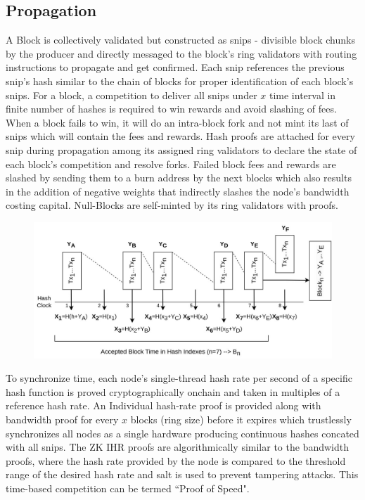 \documentclass[a4paper,	10pt]{extarticle}
\begin{document}
\subsection{Propagation}
A Block is collectively validated but constructed as snips - divisible block chunks by the producer and directly messaged to the block's ring validators with routing instructions to propagate and get confirmed. Each snip references the previous snip's hash similar to the chain of blocks for proper identification of each block's snips. For a block, a competition to deliver all snips under $x$ time interval in finite number of hashes is required to win rewards and avoid slashing of fees. When a block fails to win, it will do an intra-block fork and not mint its last of snips which will contain the fees and rewards. Hash proofs are attached for every snip during propagation among its assigned ring validators to declare the state of each block's competition and resolve forks. Failed block fees and rewards are slashed by sending them to a burn address by the next blocks which also results in the addition of negative weights that indirectly slashes the node's bandwidth costing capital. Null-Blocks are self-minted by its ring validators with proofs.\\
\begin{figure}[H]
\begin{center}
\includegraphics[width=12cm]{Snips}
\end{center}
\end{figure}
To synchronize time, each node's single-thread hash rate per second of a specific hash function is proved cryptographically onchain and taken in multiples of a reference hash rate. An Individual hash-rate proof is provided along with bandwidth proof for every $x$ blocks (ring size) before it expires which trustlessly synchronizes all nodes as a single hardware producing continuous hashes concated with all snips. The ZK IHR proofs are algorithmically similar to the bandwidth proofs, where the hash rate provided by the node is compared to the threshold range of the desired hash rate and salt is used to prevent tampering attacks. This time-based competition can be termed ``Proof of Speed".
\end{document}
